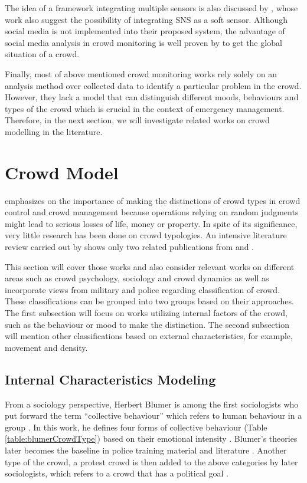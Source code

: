 The idea of a framework integrating multiple sensors is also discussed by \citet{Ramesh2014}, whose work also suggest the possibility of integrating SNS as a soft sensor. Although social media is not implemented into their proposed system, the advantage of social media analysis in crowd monitoring is well proven by \citet{DelirHaghighi2013} to get the global situation of a crowd.

Finally, most of above mentioned crowd monitoring works rely solely on an analysis method over collected data to identify a particular problem in the crowd. However, they lack a model that can distinguish different moods, behaviours and types of the crowd which is crucial in the context of emergency management. Therefore, in the next section, we will investigate related works on crowd modelling in the literature.

\section{Crowd Model}
\citet{Berlonghi1995} emphasizes on the importance of making the distinctions of crowd types in crowd control and crowd management because operations relying on random judgments might lead to serious losses of life, money or property. In spite of its significance, very little research has been done on crowd typologies. An intensive literature review carried out by \citet{Challenger2009} shows only two related publications from \citet{Momboisse1967} and \citet{Berlonghi1995}.

This section will cover those works and also consider relevant works on different areas such as crowd psychology, sociology and crowd dynamics as well as incorporate views from military and police regarding classification of crowd. These classifications can be grouped into two groups based on their approaches. The first subsection will focus on works utilizing internal factors of the crowd, such as the behaviour or mood to make the distinction. The second subsection will mention other classifications based on external characteristics, for example, movement and density.

\subsection{Internal Characteristics Modeling}

From a sociology perspective, Herbert Blumer is among the first sociologists who put forward the term ``collective behaviour'' which refers to human behaviour in a group \citep{Blumer1951}. In this work, he defines four forms of collective behaviour (Table \ref{table:blumerCrowdType}) based on their emotional intensity \citep{Imhonopi2013}. Blumer’s theories later becomes the baseline in police training material and literature \citep{Schweingruber2000}. Another type of the crowd, a protest crowd is then added to the above categories by later sociologists, which refers to a crowd that has a political goal \citep{Imhonopi2013}.

